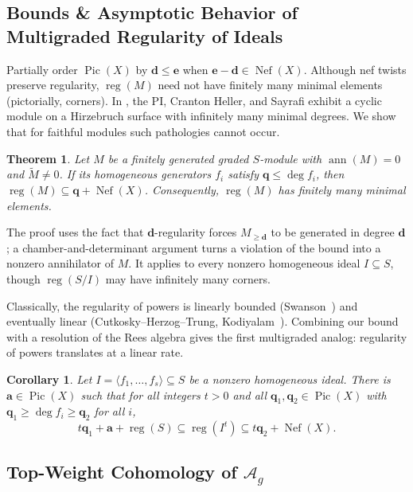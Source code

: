 \documentclass[11pt,reqno]{amsart}
\newtheorem{theorem}[lemma]{Theorem}
\newtheorem{cor}[lemma]{Corollary}
\theoremstyle{remark}
\newcommand{\reg}{\operatorname{reg}}
\newcommand{\ann}{\operatorname{ann}}
\newcommand{\Pic}{\operatorname{Pic}}
\newcommand{\Nef}{\operatorname{Nef}}
\renewcommand{\aa}{\mathbf{a}}
\newcommand{\dd}{\mathbf{d}}
\newcommand{\ee}{\mathbf{e}}
\newcommand{\qq}{\mathbf{q}}
\begin{document}
\subsection{Bounds \& Asymptotic Behavior of Multigraded Regularity of Ideals}

Partially order $\Pic(X)$ by $\dd\leq\ee$ when $\ee-\dd\in \Nef(X)$. Although nef twists preserve regularity, $\reg(M)$ need not have finitely many minimal elements (pictorially, corners). In \cite[Ex.~1.1]{bruceHellerSayrafi22}, the PI, Cranton Heller, and Sayrafi exhibit a cyclic module on a Hirzebruch surface with infinitely many minimal degrees. We show that for faithful modules such pathologies cannot occur.

\begin{theorem}\cite[Cor.~4.6]{bruceHellerSayrafi22}
Let $M$ be a finitely generated graded $S$-module with $\ann(M)=0$ and $\widetilde M\neq0$. If its homogeneous generators $f_i$ satisfy $\qq\leq\deg f_i$, then $\reg(M)\subseteq\qq+\Nef(X)$. Consequently, $\reg(M)$ has finitely many minimal elements.
\end{theorem}
The proof uses the fact that $\dd$-regularity forces $M_{\geq\dd}$ to be generated in degree $\dd$; a chamber-and-determinant argument turns a violation of the bound into a nonzero annihilator of $M$. It applies to every nonzero homogeneous ideal $I\subseteq S$, though $\reg(S/I)$ may have infinitely many corners.

Classically, the regularity of powers is linearly bounded (Swanson~\cite{swanson97}) and eventually linear (Cutkosky--Herzog--Trung, Kodiyalam~\cite{CHT99,Kodiyalam00}). Combining our bound with a resolution of the Rees algebra gives the first multigraded analog: regularity of powers translates at a linear rate.
 
\begin{cor}\cite[Thm.~5.1]{bruceHellerSayrafi22}
Let $I=\langle f_1,\ldots,f_s\rangle\subseteq S$ be a nonzero homogeneous ideal. There is $\aa\in\Pic(X)$ such that for all integers $t>0$ and all $\qq_1,\qq_2\in\Pic(X)$ with $\qq_1\geq\deg f_i\geq\qq_2$ for all $i$,
\[
t\qq_1+\aa+\reg(S)\subseteq\reg(I^t)\subseteq t\qq_2+\Nef(X).
\]
\end{cor}

\subsection{Top-Weight Cohomology of $\mathcal{A}_{g}$}\label{subsec:prior:cohomology-of-ag}
\end{document}
